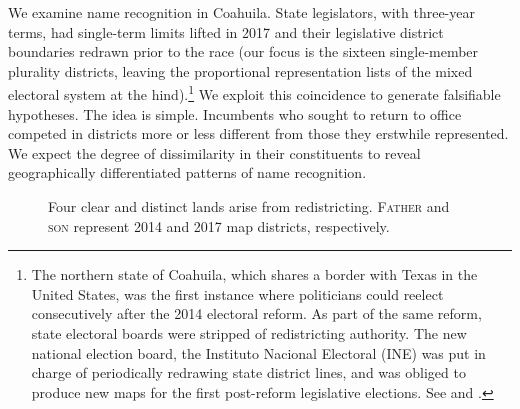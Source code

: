 \documentclass[letter,12pt]{article}
\begin{document}
We examine name recognition in Coahuila. State legislators, with three-year terms, had single-term limits lifted in 2017 and their legislative district boundaries redrawn prior to the race (our focus is the sixteen single-member plurality districts, leaving the proportional representation lists of the mixed electoral system at the hind).\footnote{The northern state of Coahuila, which shares a border with Texas in the United States, was the first instance where politicians could reelect consecutively after the 2014 electoral reform. As part of the same reform, state electoral boards were stripped of redistricting authority. The new national election board, the Instituto Nacional Electoral (INE) was put in charge of periodically redrawing state district lines, and was obliged to produce new maps for the first post-reform legislative elections. See \citet{trelles.etalDatosabiertos.pyg.2016} and \citet{magarInstReel.2017}.} We exploit this coincidence to generate falsifiable hypotheses. The idea is simple. Incumbents who sought to return to office competed in districts more or less different from those they erstwhile represented. We expect the degree of dissimilarity in their constituents to reveal geographically differentiated patterns of name recognition. 

\begin{figure}
  \centering
    \usetikzlibrary{calc}
    \caption{Four clear and distinct lands arise from redistricting. \textsc{Father} and \textsc{son} represent 2014 and 2017 map districts, respectively.}\label{F:venn}
\end{figure}
\end{document}
